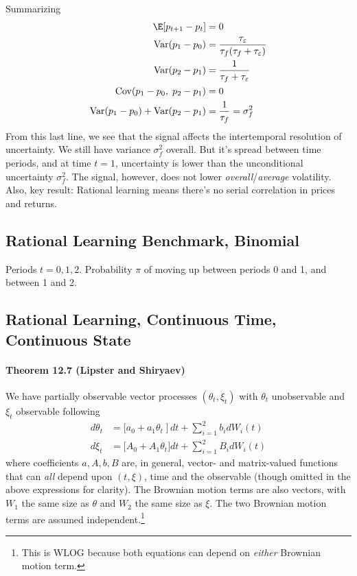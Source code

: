 \documentclass[12pt]{article}
\theoremstyle{plain}
\theoremstyle{definition}
\theoremstyle{remark}
\newcommand{\Cov}{\operatorname{Cov}}
\newcommand{\Var}{\operatorname{Var}}
\begin{document}
Summarizing
\begin{align*}
  \E[p_{t+1}-p_t]
  &= 0
  \\
  \Var(p_1-p_0)
  &=
  \frac{\tau_\varepsilon}{\tau_f(\tau_f+\tau_\varepsilon)}
  \\
  \Var(p_2-p_1)
  &= \frac{1}{\tau_f+\tau_\varepsilon}
  \\
  \Cov(p_1-p_0,\;p_2-p_1)
  &= 0
  \\
  \Var(p_1-p_0)
  +\Var(p_2-p_1)
  &=
  \frac{1}{\tau_f}
  =\sigma^2_f
\end{align*}
From this last line, we see that the signal affects the intertemporal
resolution of uncertainty. We still have variance $\sigma_f^2$ overall.
But it's spread between time periods, and at time $t=1$, uncertainty is
lower than the unconditional uncertainty $\sigma^2_f$.
The signal, however, does not lower \emph{overall}/\emph{average}
volatility.
Also, key result: Rational learning means there's no serial correlation
in prices and returns.


\subsection{Rational Learning Benchmark, Binomial}

Periods $t=0,1,2$.
Probability $\pi$ of moving up between periods 0 and 1, and between 1
and 2.


\clearpage
\subsection{Rational Learning, Continuous Time, Continuous State}

\paragraph{Theorem 12.7 (Lipster and Shiryaev)}
We have partially observable vector processes $(\theta_t,\xi_t)$ with
$\theta_t$ unobservable and $\xi_t$ observable following
\begin{align*}
  d\theta_t &=
  \big[a_0+a_1\theta_t\;\big]\,dt
  + \sum_{i=1}^2 b_idW_i(t)
  \\
  d\xi_t
  &=
  \big[A_0 + A_1\theta_t\big]dt
  + \sum_{i=1}^2 B_idW_i(t)
\end{align*}
where coefficients $a,A,b,B$ are, in general, vector- and matrix-valued
functions that can \emph{all} depend upon $(t,\xi)$, time and the
observable (though omitted in the above expressions for clarity).
The Brownian motion terms are also vectors, with $W_1$ the same size as
$\theta$ and $W_2$ the same size as $\xi$.
The two Brownian motion terms are assumed independent.\footnote{%
  This is WLOG because both equations can depend on \emph{either}
  Brownian motion term.
}
\end{document}
